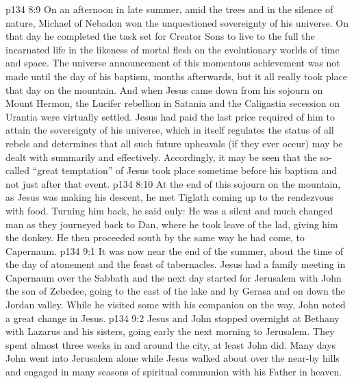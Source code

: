 \vs p134 8:9 \pc On an afternoon in late summer, amid the trees and in the silence of nature, Michael of Nebadon won the unquestioned sovereignty of his universe. On that day he completed the task set for Creator Sons to live to the full the incarnated life in the likeness of mortal flesh on the evolutionary worlds of time and space. The universe announcement of this momentous achievement was not made until the day of his baptism, months afterwards, but it all really took place that day on the mountain. And when Jesus came down from his sojourn on Mount Hermon, the Lucifer rebellion in Satania and the Caligastia secession on Urantia were virtually settled. Jesus had paid the last price required of him to attain the sovereignty of his universe, which in itself regulates the status of all rebels and determines that all such future upheavals (if they ever occur) may be dealt with summarily and effectively. Accordingly, it may be seen that the so\hyp{}called “great temptation” of Jesus took place sometime before his baptism and not just after that event.
\vs p134 8:10 At the end of this sojourn on the mountain, as Jesus was making his descent, he met Tiglath coming up to the rendezvous with food. Turning him back, he said only:  He was a silent and much changed man as they journeyed back to Dan, where he took leave of the lad, giving him the donkey. He then proceeded south by the same way he had come, to Capernaum.
\vs p134 9:1 It was now near the end of the summer, about the time of the day of atonement and the feast of tabernacles. Jesus had a family meeting in Capernaum over the Sabbath and the next day started for Jerusalem with John the son of Zebedee, going to the east of the lake and by Gerasa and on down the Jordan valley. While he visited some with his companion on the way, John noted a great change in Jesus.
\vs p134 9:2 Jesus and John stopped overnight at Bethany with Lazarus and his sisters, going early the next morning to Jerusalem. They spent almost three weeks in and around the city, at least John did. Many days John went into Jerusalem alone while Jesus walked about over the near\hyp{}by hills and engaged in many seasons of spiritual communion with his Father in heaven.
